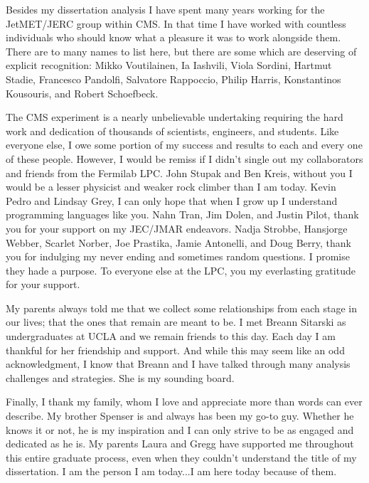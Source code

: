 Besides my dissertation analysis I have spent many years working for the JetMET/JERC group within CMS. In that time I have worked with countless individuals who should know what a pleasure it was to work alongside them. There are to many names to list here, but there are some which are deserving of explicit recognition: Mikko Voutilainen, Ia Iashvili, Viola Sordini, Hartmut Stadie, Francesco Pandolfi, Salvatore Rappoccio, Philip Harris, Konstantinos Kousouris, and Robert Schoefbeck.

The CMS experiment is a nearly unbelievable undertaking requiring the hard work and dedication of thousands of scientists, engineers, and students. Like everyone else, I owe some portion of my success and results to each and every one of these people. However, I would be remiss if I didn't single out my collaborators and friends from the Fermilab LPC. John Stupak and Ben Kreis, without you I would be a lesser physicist and weaker rock climber than I am today. Kevin Pedro and Lindsay Grey, I can only hope that when I grow up I understand programming languages like you. Nahn Tran, Jim Dolen, and Justin Pilot, thank you for your support on my JEC/JMAR endeavors. Nadja Strobbe, Hansjorge Webber, Scarlet Norber, Joe Prastika, Jamie Antonelli, and Doug Berry, thank you for indulging my never ending and sometimes random questions. I promise they hade a purpose. To everyone else at the LPC, you my everlasting gratitude for your support.

My parents always told me that we collect some relationships from each stage in our lives; that the ones that remain are meant to be. I met Breann Sitarski as undergraduates at UCLA and we remain friends to this day. Each day I am thankful for her friendship and support. And while this may seem like an odd acknowledgment, I know that Breann and I have talked through many analysis challenges and strategies. She is my sounding board.

Finally, I thank my family, whom I love and appreciate more than words can ever describe. My brother Spenser is and always has been my go-to guy. Whether he knows it or not, he is my inspiration and I can only strive to be as engaged and dedicated as he is. My parents Laura and Gregg have supported me throughout this entire graduate process, even when they couldn't understand the title of my dissertation. I am the person I am today...I am here today because of them.



\pagebreak{}